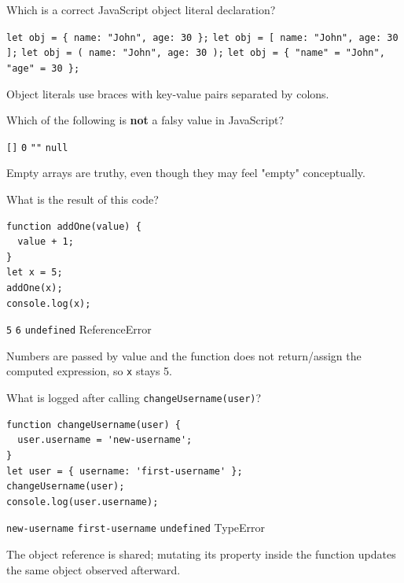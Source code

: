 \question[4]
Which is a correct JavaScript object literal declaration?
\begin{choices}
  \CorrectChoice \texttt{let obj = \{ name: "John", age: 30 \};}
  \choice \texttt{let obj = [ name: "John", age: 30 ];}
  \choice \texttt{let obj = ( name: "John", age: 30 );}
  \choice \texttt{let obj = \{ "name" = "John", "age" = 30 \};}
\end{choices}
\begin{solution}
  Object literals use braces with key-value pairs separated by colons.
\end{solution}

\question[4]
Which of the following is \textbf{not} a falsy value in JavaScript?
\begin{choices}
  \CorrectChoice \texttt{[]}
  \choice \texttt{0}
  \choice \texttt{""}
  \choice \texttt{null}
\end{choices}
\begin{solution}
  Empty arrays are truthy, even though they may feel "empty" conceptually.
\end{solution}

\question[4]
What is the result of this code?
\begin{lstlisting}[style=js]
function addOne(value) {
  value + 1;
}
let x = 5;
addOne(x);
console.log(x);
\end{lstlisting}
\begin{choices}
  \CorrectChoice \texttt{5}
  \choice \texttt{6}
  \choice \texttt{undefined}
  \choice ReferenceError
\end{choices}
\begin{solution}
  Numbers are passed by value and the function does not return/assign the computed expression, so \texttt{x} stays 5.
\end{solution}

\question[4]
What is logged after calling \texttt{changeUsername(user)}?
\begin{lstlisting}[style=js]
function changeUsername(user) {
  user.username = 'new-username';
}
let user = { username: 'first-username' };
changeUsername(user);
console.log(user.username);
\end{lstlisting}
\begin{choices}
  \CorrectChoice \texttt{new-username}
  \choice \texttt{first-username}
  \choice \texttt{undefined}
  \choice TypeError
\end{choices}
\begin{solution}
  The object reference is shared; mutating its property inside the function updates the same object observed afterward.
\end{solution}

